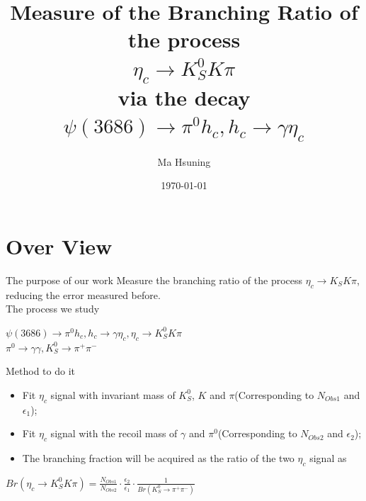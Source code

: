 \documentclass{beamer}
\title[Work Report]{Measure of the Branching Ratio of the process\\ ${\eta}_c\rightarrow K^0_S K \pi$\\ via the decay $\psi(3686)\rightarrow \pi^0 h_c, h_c\rightarrow\gamma \eta_c$}
\author{Ma Hsuning}
\institute[NKU \& \& IHEP]
{
    Nankai Univ. \&\& IHEP\\
    \medskip
    \textit{maxn@ihep.ac.cn}
}
\date{\today}
\begin{document}
\frame{\titlepage}

\section{Over View}
\begin{frame}{}
\begin{block}{The purpose of our work}
Measure the branching ratio of the process ${\eta}_c\rightarrow K_S K \pi$, reducing the error measured before.\\
\bigskip
The process we study
\begin{center}
$\psi(3686) \rightarrow {\pi}^0 h_c, h_c \rightarrow \gamma {\eta}_c, {\eta}_c \rightarrow K^0_S K \pi$\\
${\pi}^0 \rightarrow \gamma \gamma, K^0_S \rightarrow {\pi}^+ {\pi}^-$
\end{center}
\end{block}
\end{frame}

\begin{frame}{Method to do it}
\begin{block}{}
\begin{itemize}
\item Fit ${\eta}_c$ signal with invariant mass of $K_S^0$, $K$ and $\pi$(Corresponding to $N_{Obs1}$ and ${\epsilon}_1$);
\bigskip
\item Fit ${\eta}_c$ signal with the recoil mass of $\gamma$ and ${\pi}^0$(Corresponding to $N_{Obs2}$ and ${\epsilon}_2$);
\bigskip
\item The branching fraction will be acquired as the ratio of the two ${\eta}_c$ signal as
\end{itemize}
\begin{block}{}
\begin{center}
$Br({\eta}_c\rightarrow K_S^0 K \pi)=\frac{N_{Obs1}}{N_{Obs2}}\cdot \frac{{\epsilon}_2}{{\epsilon}_1} \cdot \frac{1}{Br(K_S^0 \rightarrow {\pi}^+ {\pi}^-)}$
\end{center}
\end{block}
\end{block}
\end{frame}
\end{document}
